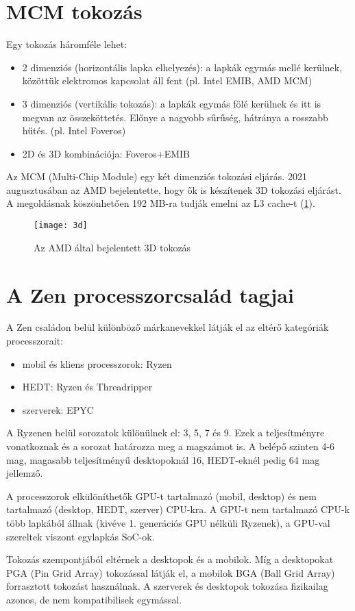 \section{MCM tokozás}
Egy tokozás háromféle lehet:
\begin{itemize}
    \item 2 dimenziós (horizontális lapka elhelyezés): a lapkák egymás mellé kerülnek, közöttük elektromos kapcsolat áll fent (pl. Intel EMIB, AMD MCM)
    \item 3 dimenziós (vertikális tokozás): a lapkák egymás fölé kerülnek és itt is megvan az összeköttetés. Előnye a nagyobb sűrűség, hátránya a rosszabb hűtés. (pl. Intel Foveros)
    \item 2D és 3D kombinációja: Foveros+EMIB
\end{itemize}
Az MCM (Multi-Chip Module) egy két dimenziós tokozási eljárás.
2021 augusztusában az AMD bejelentette, hogy ők is készítenek 3D tokozási eljárást.
A megoldásnak köszönhetően 192 MB-ra tudják emelni az L3 cache-t (\ref{fig:3d}).
\begin{figure}[H]
    \texttt{[image: 3d]}
    \centering
    \caption{Az AMD által bejelentett 3D tokozás}
    \label{fig:3d}
\end{figure}

\section{A Zen processzorcsalád tagjai}
A Zen családon belül különböző márkanevekkel látják el az eltérő kategóriák processzorait:
\begin{itemize}
    \item mobil és kliens processzorok: Ryzen
    \item HEDT: Ryzen és Threadripper
    \item szerverek: EPYC
\end{itemize}
A Ryzenen belül sorozatok különülnek el: 3, 5, 7 és 9.
Ezek a teljesítményre vonatkoznak és a sorozat határozza meg a magszámot is.
A belépő szinten 4-6 mag, magasabb teljesítményű desktopoknál 16, HEDT-eknél pedig 64 mag jellemző.

A processzorok elkülöníthetők GPU-t tartalmazó (mobil, desktop) és nem tartalmazó (desktop, HEDT, szerver) CPU-kra.
A GPU-t nem tartalmazó CPU-k több lapkából állnak (kivéve 1. generációs GPU nélküli Ryzenek), a GPU-val szereltek viszont egylapkás SoC-ok.

Tokozás szempontjából eltérnek a desktopok és a mobilok.
Míg a desktopokat PGA (Pin Grid Array) tokozással látják el, a mobilok BGA (Ball Grid Array) forrasztott tokozást használnak.
A szerverek és desktopok tokozása fizikailag azonos, de nem kompatibilisek egymással.

